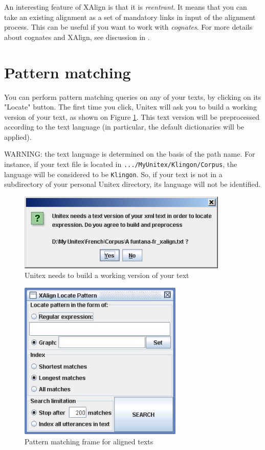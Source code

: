 \bigskip
\noindent An interesting feature of XAlign is that it is
\textit{reentrant}. It means that you can take an
existing alignment as a set of mandatory links in input of the alignment
process. This can be useful if you want to work with
\textit{cognates}. For more details about cognates and XAlign,
see discussion in \cite{IGML_PauDum08}.

\clearpage
\section{Pattern matching}
You can perform pattern matching queries on any of your texts, by clicking on
its "Locate" button. The first time you click, Unitex will ask you to build a
working version of your text, as shown on Figure \ref{x-fig6}. This text
version will be preprocessed according to the text language (in particular,
the default dictionaries will be applied).

\bigskip
\noindent WARNING: the text language is determined on the basis of the path
name. For instance, if your text file is located in \verb+.../MyUnitex/Klingon/Corpus+, 
the language will be considered to be \verb+Klingon+. So, if your text is not
in a subdirectory of your personal Unitex directory, its language will not be identified.

\begin{figure}[!ht]
\begin{center}
\includegraphics[width=10cm]{resources/img/figX-6.png}
\caption{Unitex needs to build a working version of your text\label{x-fig6}}
\end{center}
\end{figure}
 
\begin{figure}[!ht]
\begin{center}
\includegraphics[width=7.8cm]{resources/img/figX-7.png}
\caption{Pattern matching frame for aligned texts\label{x-locate-frame}}
\end{center}
\end{figure}

